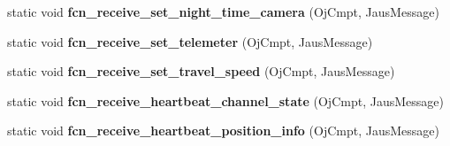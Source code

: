 \begin{DoxyCompactItemize}
\item 
\hypertarget{class_ros_node___communications_aec3cdb70596b1117cbff34cc477a4acd}{static void {\bfseries fcn\-\_\-receive\-\_\-set\-\_\-night\-\_\-time\-\_\-camera} (\-Oj\-Cmpt, \-Jaus\-Message)}\label{class_ros_node___communications_aec3cdb70596b1117cbff34cc477a4acd}

\item 
\hypertarget{class_ros_node___communications_a4b317538c5533e3483781c9bda068e29}{static void {\bfseries fcn\-\_\-receive\-\_\-set\-\_\-telemeter} (\-Oj\-Cmpt, \-Jaus\-Message)}\label{class_ros_node___communications_a4b317538c5533e3483781c9bda068e29}

\item 
\hypertarget{class_ros_node___communications_ad7a98091238af9cbd0895fd129937ea4}{static void {\bfseries fcn\-\_\-receive\-\_\-set\-\_\-travel\-\_\-speed} (\-Oj\-Cmpt, \-Jaus\-Message)}\label{class_ros_node___communications_ad7a98091238af9cbd0895fd129937ea4}

\item 
\hypertarget{class_ros_node___communications_a149f81fe35a2941b7628e71a36d9a2ff}{static void {\bfseries fcn\-\_\-receive\-\_\-heartbeat\-\_\-channel\-\_\-state} (\-Oj\-Cmpt, \-Jaus\-Message)}\label{class_ros_node___communications_a149f81fe35a2941b7628e71a36d9a2ff}

\item 
\hypertarget{class_ros_node___communications_a6d067fd99d4d08e2a7a972069af9a980}{static void {\bfseries fcn\-\_\-receive\-\_\-heartbeat\-\_\-position\-\_\-info} (\-Oj\-Cmpt, \-Jaus\-Message)}\label{class_ros_node___communications_a6d067fd99d4d08e2a7a972069af9a980}

\end{DoxyCompactItemize}
